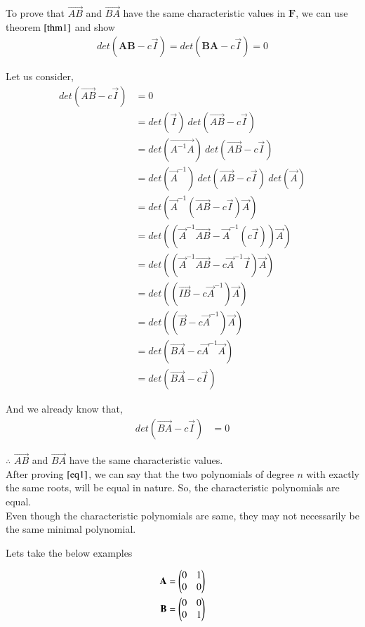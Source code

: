 \documentclass[journal,12pt,twocolumn]{IEEEtran}
\begin{document}
	To prove that $\vec{AB}$ and $\vec{BA}$ have the same characteristic values in $\mathbf{F}$, we can use theorem $\ref{thm1}$ and show
	\begin{align}\label{eq1}
		det\left(\mathbf{AB}-c\vec{I}\right) = det\left(\mathbf{BA}-c\vec{I}\right) = 0
	\end{align}
	
	Let us consider,
	\begin{align}
		det(\vec{AB}-c\vec{I}) &= 0\nonumber\\
		&= det(\vec{I})\ det(\vec{AB}-c\vec{I})\nonumber\\
		&= det(\vec{A^{-1}A})\ det(\vec{AB}-c\vec{I})\nonumber\\
		&= det(\vec{A}^{-1})\ det(\vec{AB}-c\vec{I})\ det(\vec{A})\nonumber\\
		&= det(\vec{A}^{-1}(\vec{AB}-c\vec{I})\vec{A})\nonumber\\
		&= det((\vec{A}^{-1}\vec{AB}-\vec{A}^{-1}(c\vec{I}))\vec{A})\nonumber\\
		&= det((\vec{A}^{-1}\vec{AB}-c\vec{A}^{-1}\vec{I})\vec{A})\nonumber\\
		&= det((\vec{IB}-c\vec{A}^{-1})\vec{A})\nonumber\\
		&= det((\vec{B}-c\vec{A}^{-1})\vec{A})\nonumber\\
		&= det(\vec{BA}-c\vec{A}^{-1}\vec{A})\nonumber\\
		&= det(\vec{BA}-c\vec{I})	
	\end{align}

	And we already know that, 
	\begin{align}
		det(\vec{BA}-c\vec{I}) &= 0
	\end{align}

	$\therefore$ $\vec{AB}$ and $\vec{BA}$ have the same characteristic values. \\
	
	After proving $\eqref{eq1}$, we can say that the two polynomials of degree $n$ with exactly the same roots, will be equal in nature. So, the characteristic polynomials are equal. \\
	
	Even though the characteristic polynomials are same, they may not necessarily be the same minimal polynomial.
	
	Lets take the below examples
	
	\begin{align}
		\mathbf{A} = \begin{pmatrix}0&1\\0&0\end{pmatrix} \\
		\mathbf{B} = \begin{pmatrix}0&0\\0&1\end{pmatrix}
	\end{align}
\end{document}
